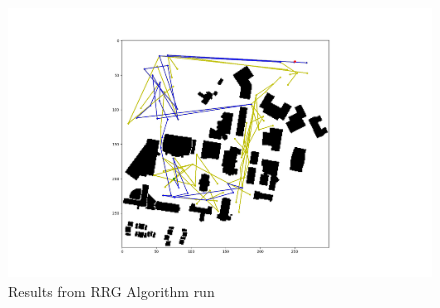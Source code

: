 \documentclass[journal]{IEEEtran}
\begin{document}
    \begin{figure}[h!]
        \centering
        \includegraphics[width=\linewidth]{figures/RRG.png}
        \caption{Results from RRG Algorithm run}
    \end{figure}
\end{document}
